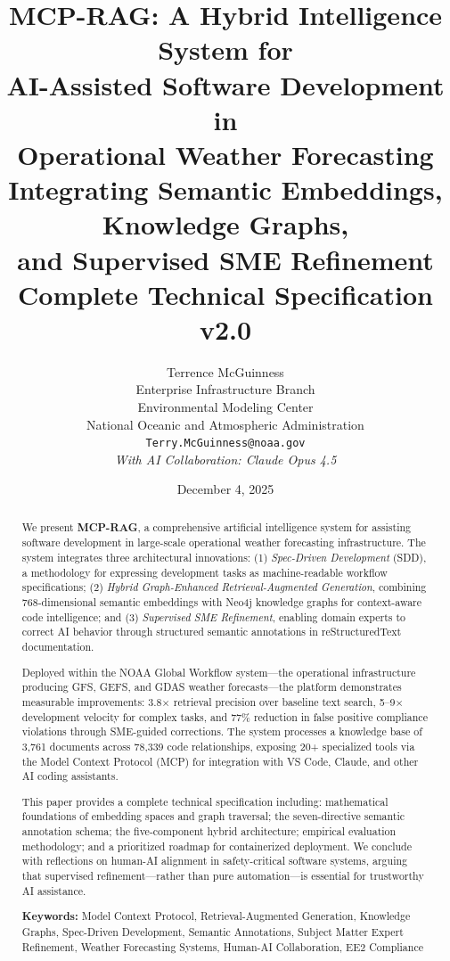 \documentclass[11pt,letterpaper]{article}
\title{%
    \vspace{-1cm}
    \textbf{MCP-RAG: A Hybrid Intelligence System for\\
    AI-Assisted Software Development in\\
    Operational Weather Forecasting}\\[0.5cm]
    \large Integrating Semantic Embeddings, Knowledge Graphs,\\
    and Supervised SME Refinement\\[0.3cm]
    \normalsize Complete Technical Specification v2.0
}
\author{
    Terrence McGuinness\\
    Enterprise Infrastructure Branch\\
    Environmental Modeling Center\\
    National Oceanic and Atmospheric Administration\\
    \texttt{Terry.McGuinness@noaa.gov}\\[0.3cm]
    \textit{With AI Collaboration: Claude Opus 4.5}
}
\date{December 4, 2025}
\newcommand{\sdd}{\textsc{SDD}}
\newcommand{\mcp}{\textsc{MCP}}
\begin{document}
\maketitle

\begin{abstract}
We present \textbf{MCP-RAG}, a comprehensive artificial intelligence system for assisting software development in large-scale operational weather forecasting infrastructure. The system integrates three architectural innovations: (1) \textit{Spec-Driven Development} (\sdd{}), a methodology for expressing development tasks as machine-readable workflow specifications; (2) \textit{Hybrid Graph-Enhanced Retrieval-Augmented Generation}, combining 768-dimensional semantic embeddings with Neo4j knowledge graphs for context-aware code intelligence; and (3) \textit{Supervised SME Refinement}, enabling domain experts to correct AI behavior through structured semantic annotations in reStructuredText documentation.

Deployed within the NOAA Global Workflow system---the operational infrastructure producing GFS, GEFS, and GDAS weather forecasts---the platform demonstrates measurable improvements: 3.8$\times$ retrieval precision over baseline text search, 5--9$\times$ development velocity for complex tasks, and 77\% reduction in false positive compliance violations through SME-guided corrections. The system processes a knowledge base of 3,761 documents across 78,339 code relationships, exposing 20+ specialized tools via the Model Context Protocol (\mcp{}) for integration with VS Code, Claude, and other AI coding assistants.

This paper provides a complete technical specification including: mathematical foundations of embedding spaces and graph traversal; the seven-directive semantic annotation schema; the five-component hybrid architecture; empirical evaluation methodology; and a prioritized roadmap for containerized deployment. We conclude with reflections on human-AI alignment in safety-critical software systems, arguing that supervised refinement---rather than pure automation---is essential for trustworthy AI assistance.

\textbf{Keywords:} Model Context Protocol, Retrieval-Augmented Generation, Knowledge Graphs, Spec-Driven Development, Semantic Annotations, Subject Matter Expert Refinement, Weather Forecasting Systems, Human-AI Collaboration, EE2 Compliance
\end{abstract}

\tableofcontents
\newpage
\end{document}
